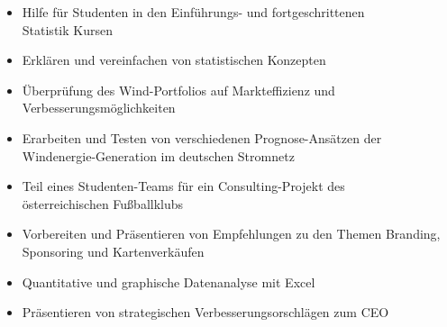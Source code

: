 \documentclass[10pt,a4paper,ragged2e]{altacv}
\begin{document}

    \begin{itemize}
        \item Hilfe für Studenten in den Einführungs- und fortgeschrittenen \\ Statistik Kursen
        \item Erklären und vereinfachen von statistischen Konzepten
    \end{itemize}

    \divider

    \begin{itemize}
        \item Überprüfung des Wind-Portfolios auf Markteffizienz und \\ Verbesserungsmöglichkeiten
        \item Erarbeiten und Testen von verschiedenen Prognose-Ansätzen der Windenergie-Generation im deutschen Stromnetz
    \end{itemize}

    \divider

    \begin{itemize}
        \item Teil eines Studenten-Teams für ein Consulting-Projekt des \\ österreichischen Fußballklubs
        \item Vorbereiten und Präsentieren von Empfehlungen zu den Themen Branding, Sponsoring und Kartenverkäufen
    \end{itemize}

    \divider

    \begin{itemize}
        \item Quantitative und graphische Datenanalyse mit Excel
        \item Präsentieren von strategischen Verbesserungsorschlägen  zum CEO
    \end{itemize}

    \medskip

    \clearpage
\end{document}
